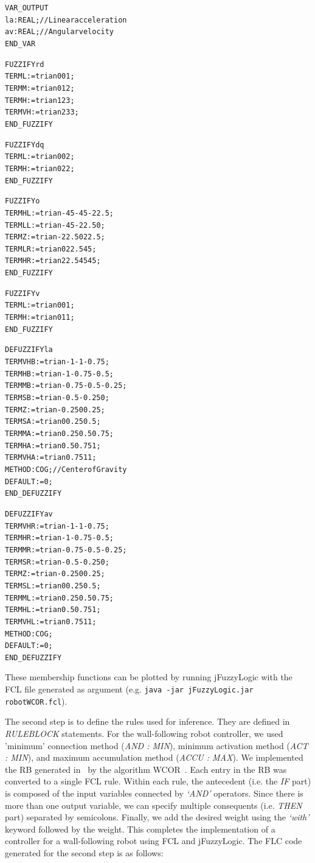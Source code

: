 \documentclass[11pt,twoside]{article}
\begin{document}
\begin{multicols}{2}
\begin{scriptsize}
\begin{alltt}
VAR\_OUTPUT
	la : REAL;			// Linear acceleration
	av : REAL;			// Angular velocity
END\_VAR

FUZZIFY rd
	TERM L  := trian 0 0 1;
	TERM M  := trian 0 1 2;
	TERM H  := trian 1 2 3;
	TERM VH := trian 2 3 3;
END\_FUZZIFY

FUZZIFY dq
	TERM L := trian 0 0 2;
	TERM H := trian 0 2 2;
END\_FUZZIFY

FUZZIFY o
	TERM HL := trian -45 -45 -22.5;
	TERM LL := trian -45 -22.5 0;
	TERM Z  := trian -22.5 0 22.5;
	TERM LR := trian 0 22.5 45;
	TERM HR := trian 22.5 45 45;
END\_FUZZIFY

FUZZIFY v
	TERM L := trian 0 0 1;
	TERM H := trian 0 1 1;
END\_FUZZIFY

DEFUZZIFY la
	TERM VHB := trian -1 -1 -0.75;
	TERM HB  := trian -1 -0.75 -0.5;
	TERM MB  := trian -0.75 -0.5 -0.25;
	TERM SB  := trian -0.5 -0.25 0;
	TERM Z   := trian -0.25 0 0.25;
	TERM SA  := trian 0 0.25 0.5;
	TERM MA  := trian 0.25 0.5 0.75;
	TERM HA  := trian 0.5 0.75 1;
	TERM VHA := trian 0.75 1 1;
	METHOD : COG;			// Center of Gravity
	DEFAULT := 0;
END\_DEFUZZIFY

DEFUZZIFY av
	TERM VHR := trian -1 -1 -0.75;
	TERM HR  := trian -1 -0.75 -0.5;
	TERM MR  := trian -0.75 -0.5 -0.25;
	TERM SR  := trian -0.5 -0.25 0;
	TERM Z   := trian -0.25 0 0.25;
	TERM SL  := trian 0 0.25 0.5;
	TERM ML  := trian 0.25 0.5 0.75;
	TERM HL  := trian 0.5 0.75 1;
	TERM VHL := trian 0.75 1 1;
	METHOD : COG;
	DEFAULT := 0;
END\_DEFUZZIFY
\end{alltt}
\end{scriptsize}
\vspace*{5pt}

These membership functions can be plotted by running jFuzzyLogic with the FCL file generated as argument (e.g. \texttt{java -jar jFuzzyLogic.jar robotWCOR.fcl}). 

The second step is to define the rules used for inference. They are defined in \textit{RULEBLOCK} statements. For the wall-following robot controller, we used 'minimum' connection method (\textit{AND : MIN}), minimum activation method (\textit{ACT : MIN}), and maximum accumulation method (\textit{ACCU : MAX}).  We implemented the RB generated in~\cite{Mucientes2010} by the algorithm WCOR~\cite{Alc06}. Each entry in the RB was converted to a single FCL rule. Within each rule, the antecedent (i.e. the \textit{IF} part) is composed of the input variables connected by \textit{`AND'} operators. Since there is more than one output variable, we can specify multiple consequents (i.e. \textit{THEN} part) separated by semicolons. Finally, we add the desired weight using the \textit{`with'} keyword followed by the weight. This completes the implementation of a controller for a wall-following robot using FCL and jFuzzyLogic. The FLC code generated for the second step is as follows:


\end{multicols}
\end{document}
